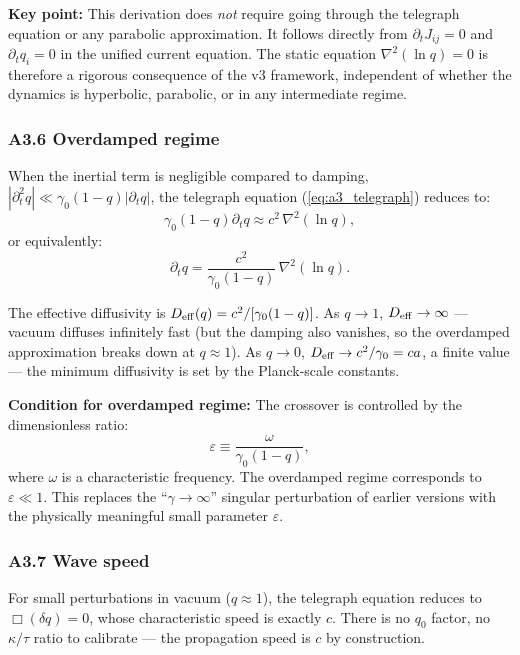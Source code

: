 \documentclass[reprint]{revtex4-2}
\begin{document}
\textbf{Key point:} This derivation does \emph{not} require going through the telegraph equation or any parabolic approximation. It follows directly from $\partial_t J_{ij}=0$ and $\partial_t q_i=0$ in the unified current equation. The static equation $\nabla^2(\ln q)=0$ is therefore a rigorous consequence of the v3 framework, independent of whether the dynamics is hyperbolic, parabolic, or in any intermediate regime.

\subsubsection{A3.6 Overdamped regime}

When the inertial term is negligible compared to damping, $|\partial_t^2 q| \ll \gamma_0(1-q)|\partial_t q|$, the telegraph equation (\ref{eq:a3_telegraph}) reduces to:
\begin{equation}
\gamma_0(1-q)\partial_t q \approx c^2\,\nabla^2(\ln q),
\end{equation}
or equivalently:
\begin{equation}
\boxed{\partial_t q = \frac{c^2}{\gamma_0(1-q)}\,\nabla^2(\ln q)}.
\label{eq:a3_overdamped}
\end{equation}

The effective diffusivity is $D_{\rm eff}(q) = c^2/[\gamma_0(1-q)]$. As $q\to 1$, $D_{\rm eff}\to\infty$ --- vacuum diffuses infinitely fast (but the damping also vanishes, so the overdamped approximation breaks down at $q\approx 1$). As $q\to 0$, $D_{\rm eff}\to c^2/\gamma_0 = ca$, a finite value --- the minimum diffusivity is set by the Planck-scale constants.

\textbf{Condition for overdamped regime:} The crossover is controlled by the dimensionless ratio:
\begin{equation}
\varepsilon \equiv \frac{\omega}{\gamma_0(1-q)},
\end{equation}
where $\omega$ is a characteristic frequency. The overdamped regime corresponds to $\varepsilon \ll 1$. This replaces the ``$\gamma\to\infty$'' singular perturbation of earlier versions with the physically meaningful small parameter $\varepsilon$.

\subsubsection{A3.7 Wave speed}

For small perturbations in vacuum ($q\approx 1$), the telegraph equation reduces to $\Box(\delta q)=0$, whose characteristic speed is exactly $c$. There is no $q_0$ factor, no $\kappa/\tau$ ratio to calibrate --- the propagation speed is $c$ by construction.
\end{document}
